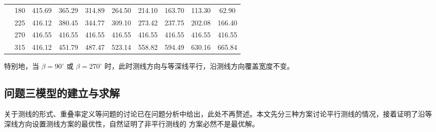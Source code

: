 \documentclass[withoutpreface,bwprint]{cumcmthesis} %
\begin{document}
\begin{table}[H]
\begin{center}
\begin{tabular}{|cc|cccccccc|}
            \multicolumn{1}{|c|}{}                          & 180 & \multicolumn{1}{c|}{415.69}  & \multicolumn{1}{c|}{365.29}    & \multicolumn{1}{c|}{314.89}    & \multicolumn{1}{c|}{264.50}    & \multicolumn{1}{c|}{214.10}    & \multicolumn{1}{c|}{163.70}    & \multicolumn{1}{c|}{113.30}    &   62.90  \\ \cline{2-10} 
            \multicolumn{1}{|c|}{}                          & 225 & \multicolumn{1}{c|}{416.12}  & \multicolumn{1}{c|}{380.45}    & \multicolumn{1}{c|}{344.77}    & \multicolumn{1}{c|}{309.10}    & \multicolumn{1}{c|}{273.42}    & \multicolumn{1}{c|}{237.75}    & \multicolumn{1}{c|}{202.08}    &   166.40  \\ \cline{2-10} 
            \multicolumn{1}{|c|}{}                          & 270 & \multicolumn{1}{c|}{416.55}  & \multicolumn{1}{c|}{416.55}    & \multicolumn{1}{c|}{416.55}    & \multicolumn{1}{c|}{416.55}    & \multicolumn{1}{c|}{416.55}    & \multicolumn{1}{c|}{416.55}    & \multicolumn{1}{c|}{416.55}    &   416.55  \\ \cline{2-10} 
            \multicolumn{1}{|c|}{}                          & 315 & \multicolumn{1}{c|}{416.12}  & \multicolumn{1}{c|}{451.79}    & \multicolumn{1}{c|}{487.47}    & \multicolumn{1}{c|}{523.14}    & \multicolumn{1}{c|}{558.82}    & \multicolumn{1}{c|}{594.49}    & \multicolumn{1}{c|}{630.16}    &   665.84  \\ \hline
            \end{tabular}
            \end{center}
        \end{table}

        特别地，当 $\beta = 90^\circ$ 或 $\beta = 270^\circ$ 时，此时测线方向与等深线平行，沿测线方向覆盖宽度不变。
        
        \subsection{问题三模型的建立与求解}
        关于测线的形式、重叠率定义等问题的讨论已在问题分析中给出，此处不再赘述。本文先分三种方案讨论平行测线的情况，接着证明了沿等深线方向设置测线方案的最优性，自然证明了非平行测线的
        方案必然不是最优解。
\end{document}
